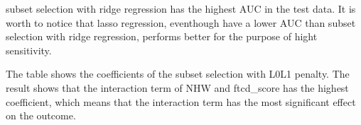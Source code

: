 \documentclass[
  letterpaper,
  DIV=11,
  numbers=noendperiod]{scrartcl}
\newenvironment{Shaded}{\begin{snugshade}}{\end{snugshade}}
\newcommand{\CommentTok}[1]{\textcolor[rgb]{0.37,0.37,0.37}{#1}}
\newcommand{\DecValTok}[1]{\textcolor[rgb]{0.68,0.00,0.00}{#1}}
\newcommand{\FunctionTok}[1]{\textcolor[rgb]{0.28,0.35,0.67}{#1}}
\newcommand{\NormalTok}[1]{\textcolor[rgb]{0.00,0.23,0.31}{#1}}
\newcommand{\OtherTok}[1]{\textcolor[rgb]{0.00,0.23,0.31}{#1}}
\newcommand{\SpecialCharTok}[1]{\textcolor[rgb]{0.37,0.37,0.37}{#1}}
\begin{document}
subset selection with ridge regression has the highest AUC in the test
data. It is worth to notice that lasso regression, eventhough have a
lower AUC than subset selection with ridge regression, performs better
for the purpose of hight sensitivity.

\begin{Shaded}
\end{Shaded}

The table shows the coefficients of the subset selection with L0L1
penalty. The result shows that the interaction term of NHW and
ftcd\_score has the highest coefficient, which means that the
interaction term has the most significant effect on the outcome.
\end{document}
